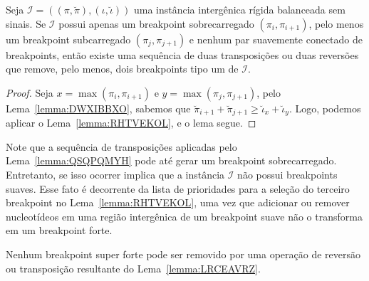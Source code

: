 \begin{lemma}\label{lemma:QSQPQMYH}
Seja $\mathcal{I} = ((\pi,\breve\pi),(\iota,\breve\iota))$ uma instância intergênica rígida balanceada sem sinais. Se $\mathcal{I}$ possui apenas um breakpoint sobrecarregado $(\pi_i,\pi_{i+1})$, pelo menos um breakpoint subcarregado $(\pi_j,\pi_{j+1})$ e nenhum par suavemente conectado de breakpoints, então existe uma sequência de duas transposições ou duas reversões que remove, pelo menos, dois breakpoints tipo um de $\mathcal{I}$.
\end{lemma}
\begin{proof}
Seja $x = \max(\pi_i,\pi_{i+1})$ e $y=\max(\pi_j,\pi_{j+1})$, pelo Lema~\ref{lemma:DWXIBBXO}, sabemos que $\breve\pi_{i+1} + \breve\pi_{j+1} \ge \breve\iota_{x} + \breve\iota_{y}$. Logo, podemos aplicar o Lema~\ref{lemma:RHTVEKOL}, e o lema segue.
\end{proof}

Note que a sequência de transposições aplicadas pelo Lema~\ref{lemma:QSQPQMYH} pode até gerar um breakpoint sobrecarregado. Entretanto, se isso ocorrer implica que a instância $\mathcal{I}$ não possui breakpoints suaves. Esse fato é decorrente da lista de prioridades para a seleção do terceiro breakpoint no Lema~\ref{lemma:RHTVEKOL}, uma vez que adicionar ou remover nucleotídeos em uma região intergênica de um breakpoint suave não o transforma em um breakpoint forte.

\begin{remark}\label{remark:QVNWZDDQ}
Nenhum breakpoint super forte pode ser removido por uma operação de reversão ou transposição resultante do Lema~\ref{lemma:LRCEAVRZ}.
\end{remark}

